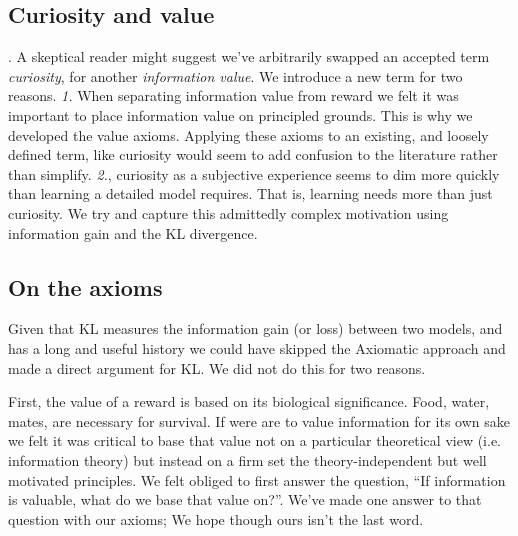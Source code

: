 \documentclass[9pt,twocolumn,twoside]{pnas-new}
\begin{document}


\subsection*{Curiosity and value}.
A skeptical reader might suggest we've arbitrarily swapped an accepted term \textit{curiosity}, for another \textit{information value}. We introduce a new term for two reasons. \textit{1.} When separating information value from reward we felt it was important to place information value on principled grounds. This is why we developed the value axioms. Applying these axioms to an existing, and loosely defined term, like curiosity would seem to add confusion to the literature rather than simplify. \textit{2.}, curiosity as a subjective experience seems to dim more quickly than learning a detailed model requires. That is, learning needs more than just curiosity. We try and capture this admittedly complex motivation using information gain and the KL divergence.

\subsection*{On the axioms} 
Given that KL measures the information gain (or loss) between two models, and has a long and useful history %
we could have skipped the Axiomatic approach and made a direct argument for KL. We did not do this for two reasons. 

First, the value of a reward is based on its biological significance. Food, water, mates, are necessary for survival. If were are to value information for its own sake we felt it was critical to base that value not on a particular theoretical view (i.e. information theory) but instead on a firm set the theory-independent but well motivated principles. We felt obliged to first answer the question, ``If information is valuable, what do we base that value on?''. We've made one answer to that question with our axioms; We hope though ours isn't the last word.
\end{document}
